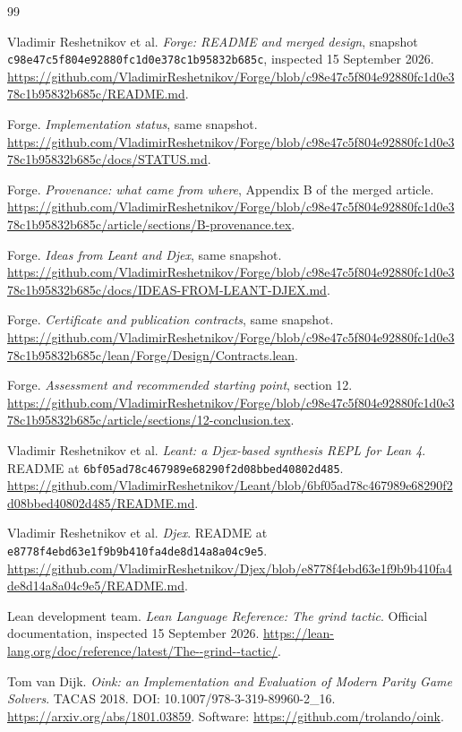 \begin{thebibliography}{99}
\raggedright
{}
Vladimir Reshetnikov et al. \emph{Forge: README and merged design}, snapshot
\texttt{c98e47c5f804e92880fc1d0e378c1b95832b685c}, inspected 15 September 2026.
\url{https://github.com/VladimirReshetnikov/Forge/blob/c98e47c5f804e92880fc1d0e378c1b95832b685c/README.md}.

Forge. \emph{Implementation status}, same snapshot.
\url{https://github.com/VladimirReshetnikov/Forge/blob/c98e47c5f804e92880fc1d0e378c1b95832b685c/docs/STATUS.md}.

Forge. \emph{Provenance: what came from where}, Appendix B of the merged article.
\url{https://github.com/VladimirReshetnikov/Forge/blob/c98e47c5f804e92880fc1d0e378c1b95832b685c/article/sections/B-provenance.tex}.

Forge. \emph{Ideas from Leant and Djex}, same snapshot.
\url{https://github.com/VladimirReshetnikov/Forge/blob/c98e47c5f804e92880fc1d0e378c1b95832b685c/docs/IDEAS-FROM-LEANT-DJEX.md}.

Forge. \emph{Certificate and publication contracts}, same snapshot.
\url{https://github.com/VladimirReshetnikov/Forge/blob/c98e47c5f804e92880fc1d0e378c1b95832b685c/lean/Forge/Design/Contracts.lean}.

Forge. \emph{Assessment and recommended starting point}, section 12.
\url{https://github.com/VladimirReshetnikov/Forge/blob/c98e47c5f804e92880fc1d0e378c1b95832b685c/article/sections/12-conclusion.tex}.

Vladimir Reshetnikov et al. \emph{Leant: a Djex-based synthesis REPL for Lean 4}.
README at \texttt{6bf05ad78c467989e68290f2d08bbed40802d485}.
\url{https://github.com/VladimirReshetnikov/Leant/blob/6bf05ad78c467989e68290f2d08bbed40802d485/README.md}.

Vladimir Reshetnikov et al. \emph{Djex}. README at
\texttt{e8778f4ebd63e1f9b9b410fa4de8d14a8a04c9e5}.
\url{https://github.com/VladimirReshetnikov/Djex/blob/e8778f4ebd63e1f9b9b410fa4de8d14a8a04c9e5/README.md}.

Lean development team. \emph{Lean Language Reference: The grind tactic}.
Official documentation, inspected 15 September 2026.
\url{https://lean-lang.org/doc/reference/latest/The--grind--tactic/}.

Tom van Dijk. \emph{Oink: an Implementation and Evaluation of Modern Parity
Game Solvers}. TACAS 2018. DOI: 10.1007/978-3-319-89960-2\_16.
\url{https://arxiv.org/abs/1801.03859}.
Software: \url{https://github.com/trolando/oink}.


\end{thebibliography}
